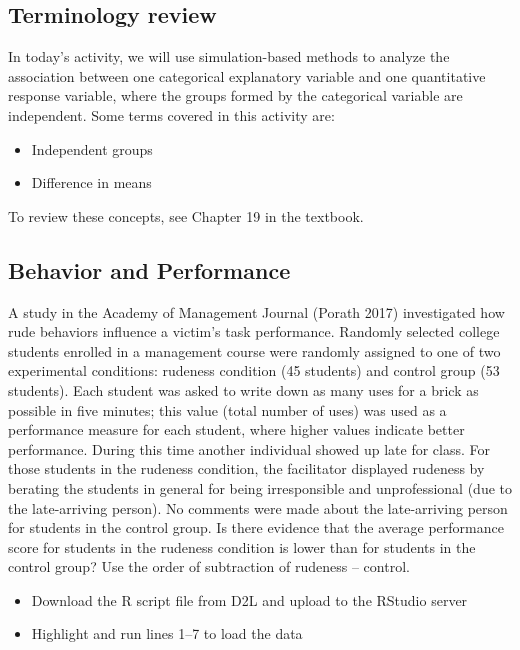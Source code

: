 \documentclass[
]{report}
\begin{document}
\subsection{Terminology review}\label{terminology-review}

In today's activity, we will use simulation-based methods to analyze the association between one categorical explanatory variable and one quantitative response variable, where the groups formed by the categorical variable are independent. Some terms covered in this activity are:

\begin{itemize}
\item
  Independent groups
\item
  Difference in means
\end{itemize}

To review these concepts, see Chapter 19 in the textbook.

\subsection{Behavior and Performance}\label{behavior-and-performance}

A study in the Academy of Management Journal (Porath 2017) investigated how rude behaviors influence a victim's task performance. Randomly selected college students enrolled in a management course were randomly assigned to one of two experimental conditions: rudeness condition (45 students) and control group (53 students). Each student was asked to write down as many uses for a brick as possible in five minutes; this value (total number of uses) was used as a performance measure for each student, where higher values indicate better performance. During this time another individual showed up late for class. For those students in the rudeness condition, the facilitator displayed rudeness by berating the students in general for being irresponsible and unprofessional (due to the late-arriving person). No comments were made about the late-arriving person for students in the control group. Is there evidence that the average performance score for students in the rudeness condition is lower than for students in the control group? Use the order of subtraction of rudeness -- control.

\begin{itemize}
\item
  Download the R script file from D2L and upload to the RStudio server
\item
  Highlight and run lines 1--7 to load the data
\end{itemize}
\end{document}
